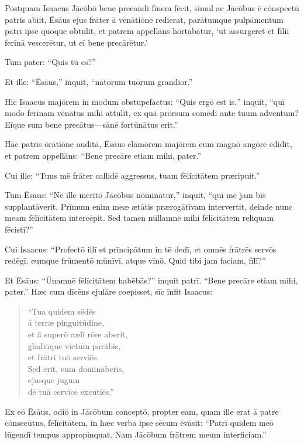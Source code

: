 \Versus Postquam Isaacus Jācōbō bene precandī fīnem fēcit, simul ac Jācōbus ē cōnspectū patris abiit, Ēsāus ejus frāter ā vēnātiōnē redierat,
\Versus parātumque pulpāmentum patrī ipse quoque obtulit, et patrem appellāns hortābātur, `ut assurgeret et fīliī ferīnā vescerētur, ut eī bene precārētur.'

\Versus Tum pater: ``Quis tū es?''

Et ille: ``Ēsāus,'' inquit, ``nātōrum tuōrum grandior.''

\Versus Hīc Isaacus majōrem in modum obstupefactus: ``Quis ergō est is,'' inquit, ``quī modo ferīnam vēnātus mihi attulit, ex quā prōrsum comēdī ante tuum adventum? Eīque sum bene precātus—sānē fortūnātus erit.''

\Versus Hāc patris ōrātiōne audītā, Ēsāus clāmōrem majōrem cum magnō angōre ēdidit, et patrem appellāns: ``Bene precāre etiam mihi, pater.''

\Versus Cui ille: ``Tuus mē frāter callidē aggressus, tuam fēlīcitātem præripuit.''

\Versus Tum Ēsāus: ``Nē ille meritō Jācōbus nōminātur,'' inquit, ``quī mē jam bis supplantāverit. Prīmum enim meæ ætātis prærogātīvam intervertit, deinde nunc meam fēlīcitātem intercēpit. Sed tamen nūllamne mihi fēlīcitātem reliquam fēcistī?''

\Versus Cui Isaacus: ``Profectō illī et prīncipātum in tē dedī, et omnēs frātrēs servōs redēgī, eumque frūmentō mūnīvī, atque vīnō. Quid tibi jam faciam, fīlī?''

\Versus Et Ēsāus: ``Ūnamnē fēlīcitātem habēbās?'' inquit patrī. ``Bene precāre etiam mihi, pater.''
Hæc cum dīcēns ejulāre coepisset,
\Versus sīc īnfit Isaacus:

\begin{verse}
\begin{patverse*}
``Tua quidem sēdēs\\
 ā terræ pinguitūdine,\\
 et ā superō cælī rōre aberit,\\
\Versus gladiōque vīctum parābis,\\
 et frātrī tuō serviēs.\\
 Sed erit, cum domināberis,\\
 ejusque jugum \\
 dē tuā cervīce excutiēs.''
\end{patverse*}
\end{verse}

\Versus Ex eō Ēsāus, odiō in Jācōbum conceptō, propter eam, quam ille erat ā patre cōnsecūtus, fēlīcitātem, in hæc verba ipse sēcum ēvāsit: ``Patrī quidem meō lūgendī tempus appropinquat. Nam Jācōbum frātrem meum interficiam.''

